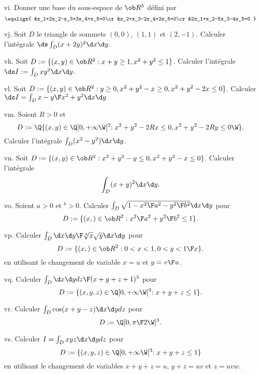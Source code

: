 \exo [Level=1,Fight=0,Learn=0,Field=\EspacesVectoriels,Type=\Exercices,Origin=] vi. 
Donner une base du sous-espace de $\ob R^5$ défini par 
$$
\eqalign{
&x_1+2x_2-x_3+3x_4+x_5=0\cr
&x_2+x_3-2x_4+2x_5=0\cr
&2x_1+x_2-5x_3-4x_5=0
}
$$

\exo  [Level=1,Fight=0,Learn=1,Field=\IntégralesMultiples,Type=\Exercices,Origin=] vj. 
Soit $D$ le triangle de sommets $(0,0)$, $(1,1)$ et $(2,-1)$. Calculer l'intégrale $\ds\int_D(x+2y)^2\d x\d y$. 

\exo [Level=1,Fight=0,Learn=1,Field=\IntégralesMultiples,Type=\Exercices,Origin=] vk. 
Soit $D:=\{(x,y)\in\ob R^2:x+y\ge1,x^2+y^2\le 1\}$. Calculer l'intégrale $\ds I:=\int_Dxy^2\d x\d y$. 

\exo [Level=1,Fight=0,Learn=1,Field=\IntégralesMultiples,Type=\Exercices,Origin=] vl. 
Soit $D:=\{(x,y)\in\ob R^2:y\ge0, x^2+y^2-x\ge0,x^2+y^2-2x\le 0\}$. Calculer $\ds I=\int_D{x-y\F x^2+y^2}\d x\d y$

\exo [Level=1,Fight=0,Learn=1,Field=\IntégralesMultiples,Type=\Exercices,Origin=] vm. 
Soient $R>0$ et $$
D:=\Q\{(x,y)\in\Q[0,+\infty\W[^2:x^2+y^2-2Rx\le 0,x^2+y^2-2Ry\le 0\W\}.
$$
Calculer l'intégrale $\int_D(x^2-y^2)\d x\d y$.


\exo [Level=1,Fight=0,Learn=1,Field=\IntégralesMultiples,Type=\Exercices,Origin=] vn. 
Soit $D:=\{(x,y)\in\ob R^2:x^2+y^2-y\le 0,x^2+y^2-x\le 0\}$.
Calculer l'intégrale 
$$
\int_D(x+y)^2\d x\d y.
$$


\exo [Level=1,Fight=1,Learn=2,Field=\IntégralesMultiples,Type=\Exercices,Origin=] vo. 
Soient $a>0$ et $^b>0$. Calculer $\int_D\sqrt{1-{x^2\F a^2}-{y^2\F b^2}}\d x\d y$ pour 
$$
D:=\{(x,)\in\ob R^2:{x^2\F a^2}+{y^2\F b^2}\le 1\}. 
$$

\exo [Level=1,Fight=1,Learn=1,Field=\IntégralesMultiples,Type=\Exercices,Origin=] vp. 
Calculer $\int_D{\d x\d y\F \root 4\of x\sqrt y}\d x\d y$ pour 
$$
D:=\{(x,)\in\ob R^2:0<x<1,0<y<{1\F x}\}. 
$$
en utilisant le changement de variable $x=u$ et $y={v\F u}$. 

\exo [Level=1,Fight=1,Learn=1,Field=\IntégralesMultiples,Type=\Exercices,Origin=] vq. 
Calculer $\int_D{\d x\d ydz\F (x+y+z+1)^3}$ pour 
$$
D:=\{(x,y,z)\in\Q[0,+\infty\W[^3:x+y+z\le1\}. 
$$

\exo [Level=1,Fight=0,Learn=1,Field=\IntégralesMultiples,Type=\Exercices,Origin=] vr. 
Calculer $\int_D\cos(x+y-z)\d x\d ydz$ pour 
$$
D:=\Q[0,{\pi\F2}\W]^3. 
$$

\exo [Level=1,Fight=1,Learn=1,Field=\IntégralesMultiples,Type=\Exercices,Origin=] vs.  
Calculer $I=\int_Dxyz\d x\d ydz$ pour 
$$
D:=\{(x,y,z)\in\Q[0,+\infty\W[^3:x+y+z\le 1\} 
$$
en utilisant le changement de variables $x+y+z=u$, $y+z=uv$ et $z=uvw$. 


